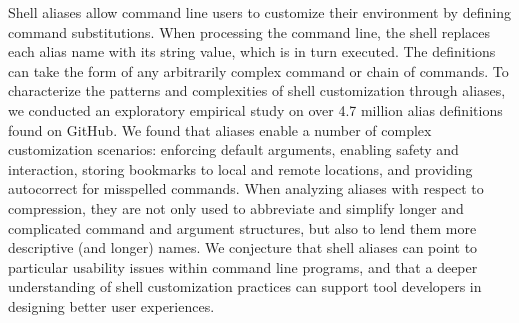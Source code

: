 Shell aliases allow command line users to customize their environment by defining command substitutions.
When processing the command line, the shell replaces each alias name with its string value, which is in turn executed.
The definitions can take the form of any arbitrarily complex command or chain of commands.
To characterize the patterns and complexities of shell customization through aliases, we conducted an exploratory empirical study on over 4.7 million alias definitions found on GitHub.
We found that aliases enable a number of complex customization scenarios: enforcing default arguments, enabling safety and interaction, storing bookmarks to local and remote locations, and providing autocorrect for misspelled commands.
When analyzing aliases with respect to compression, they are not only used to abbreviate and simplify longer and complicated command and argument structures, but also to lend them more descriptive (and longer) names.
We conjecture that shell aliases can point to particular usability issues within command line programs, and that a deeper understanding of shell customization practices can support tool developers in designing better user experiences.
